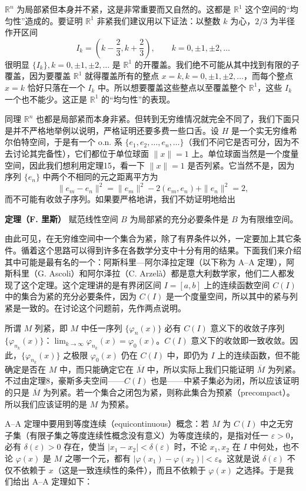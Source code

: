 $\mathbb R^n$ 为局部紧但本身并不紧，这是非常重要而又自然的。这都是 $\mathbb R^1$ 这个空间的“均匀性”造成的。要证明 $\mathbb R^1$ 非紧我们建议用以下证法：以整数 $k$ 为心，$2/3$ 为半径作开区间
\[
 I_k=\left(k-\frac23,k+\frac23\right),\qquad k=0,\pm1,\pm2,\ldots
\]
很明显 $\{I_k\},k=0,\pm1,\pm2,\ldots$ 是 $\mathbb R^1$ 的开覆盖。我们绝不可能从其中找到有限的子覆盖，因为要覆盖 $\mathbb R^1$ 就得覆盖所有的整点 $x=k,k=0,\pm1,\pm2,\ldots$，而每个整点 $x=k$ 恰好只落在一个 $I_k$ 中。所以想要覆盖这些整点以至覆盖整个 $\mathbb R^1$，这些 $I_k$ 一个也不能少。这正是 $\mathbb R^1$ 的“均匀性”的表现。

同理 $\mathbb R^n$ 也都是局部紧而本身非紧。但转到无穷维情况就完全不同了，我们下面只是并不严格地举例以说明，严格证明还要多费一些口舌。设 $H$ 是一个实无穷维希尔伯特空间，于是有一个 o.n. 系 $\{e_1,e_2,\ldots,e_n,\ldots\}$（我们不问它是否可分，因为不去讨论其完备性），它们都位于单位球面 $\|x\|=1$ 上。单位球面当然是一个度量空间，因此我们想利用定理15，看一下 $\|x\|=1$ 是否列紧。它当然不是，因为序列 $\{e_n\}$ 中两个不相同的元之距离平方为
\[
 \|e_m-e_n\|^2=\|e_m\|^2-2(e_m,e_n)+\|e_n\|^2=2,
\]
而不可能有收敛子序列。如果要严格地讲，我们不妨证明地给出

\noindent\textbf{定理（F. 里斯）}\quad
赋范线性空间 $B$ 为局部紧的充分必要条件是 $B$ 为有限维空间。

由此可见，在无穷维空间中一个集合为紧，除了有界条件以外，一定要加上其它条件。循着这个思路可以得到许多在各数学分支中十分有用的结果。下面我们来介绍其中可能是最有名的一个：阿斯科里—阿尔泽拉定理（以下称为 A--A 定理），阿斯科里（G. Ascoli）和阿尔泽拉（C. Arzelà）都是意大利数学家，他们二人都发现了这个定理。这个定理讲的是有界闭区间 $I=[a,b]$ 上的连续函数空间 $C(I)$ 中的集合为紧的充分必要条件，因为 $C(I)$ 是一个度量空间，所以其中的紧与列紧是一致的。在讨论这个问题前，先作两点说明。

所谓 $M$ 列紧，即 $M$ 中任一序列 $\{\varphi_n(x)\}$ 必有 $C(I)$ 意义下的收敛子序列 $\{\varphi_{n_k}(x)\}$：$\lim_{k\to\infty}\varphi_{n_k}(x)=\varphi_0(x)$。$C(I)$ 意义下的收敛即一致收敛。因此，$\{\varphi_{n_k}(x)\}$ 之极限 $\varphi_0(x)$ 仍在 $C(I)$ 中，即仍为 $I$ 上的连续函数，但不能确定是否在 $M$ 中，而只能确定它在 $\overline M$ 中，所以实际上我们只能证明 $\overline M$ 为列紧。不过由定理8，豪斯多夫空间——$C(I)$ 也是——中紧子集必为闭，所以应该证明的只是 $\overline M$ 为列紧。若一个集合之闭包为紧，则称此集合为预紧（precompact）。所以我们应该证明的是 $M$ 为预紧。

A--A 定理中要用到等度连续（equicontinuous）概念：若 $M$ 为 $C(I)$ 中之无穷子集（有限子集之等度连续性概念没有意义）为等度连续的，是指对任一 $\varepsilon>0$，必有 $\delta(\varepsilon)>0$ 存在，使当 $|x_1-x_2|<\delta(\varepsilon)$ 时，不论 $x_1,x_2$ 在 $I$ 中何处，也不论 $\varphi(x)$ 是 $M$ 之哪一个元，都有 $|\varphi(x_1)-\varphi(x_2)|<\varepsilon$。这就是说 $\delta(\varepsilon)$ 不仅不依赖于 $x$（这是一致连续性的条件），而且不依赖于 $\varphi(x)$ 之选择。于是我们给出 A--A 定理如下：

